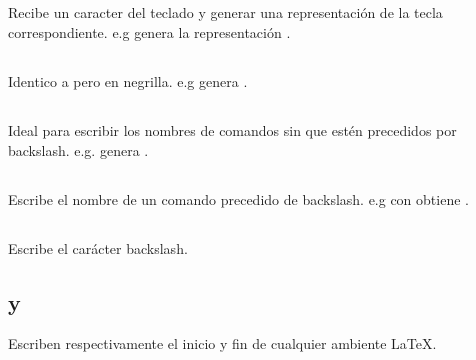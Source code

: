 \documentclass{article}
\begin{document}
	\subsection{}
		Recibe un caracter del teclado y generar una representación de la tecla correspondiente. e.g \texttt{\keystroke{\%}} genera la representación \keystroke{\%}.
		
	\subsection{}
		Identico a  pero en negrilla. e.g \texttt{} genera .
		
	\subsection{}
		Ideal para escribir los nombres de comandos sin que estén precedidos por backslash. e.g. \texttt{} genera .
		
	\subsection{}
		Escribe el nombre de un comando precedido de backslash. e.g con \texttt{} obtiene .
		
	\subsection{}	
		Escribe el carácter backslash.
		
	\subsection{ y }	
		Escriben respectivamente el inicio y fin de cualquier ambiente \LaTeX{}. 
\end{document}
